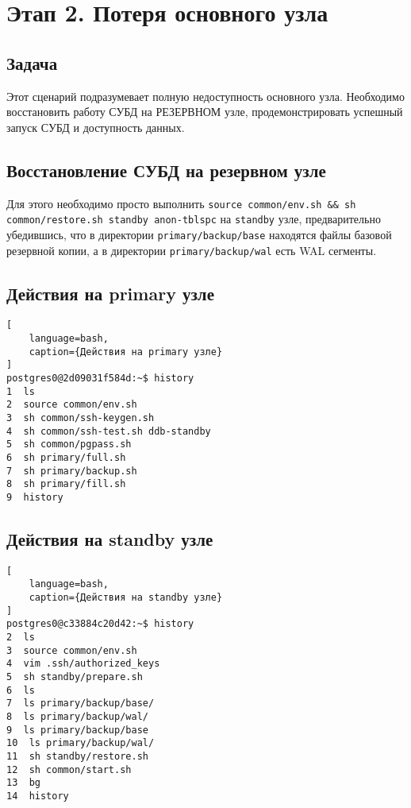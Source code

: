 \documentclass{article}
\begin{document}
\section{Этап 2. Потеря основного узла}

\subsection{Задача}

Этот сценарий подразумевает полную недоступность основного узла. Необходимо восстановить работу СУБД на РЕЗЕРВНОМ узле, продемонстрировать успешный запуск СУБД и доступность данных.

\subsection{Восстановление СУБД на резервном узле}

Для этого необходимо просто выполнить
\texttt{source common/env.sh \&\& sh common/restore.sh standby anon-tblspc}
на \texttt{standby} узле, предварительно убедившись, что в
директории \texttt{primary/backup/base} находятся файлы базовой резервной копии,
а в директории \texttt{primary/backup/wal} есть WAL сегменты.



\subsection{Действия на primary узле}

\begin{lstlisting}[
    language=bash,
    caption={Действия на primary узле}
]
postgres0@2d09031f584d:~$ history
1  ls
2  source common/env.sh 
3  sh common/ssh-keygen.sh 
4  sh common/ssh-test.sh ddb-standby
5  sh common/pgpass.sh 
6  sh primary/full.sh 
7  sh primary/backup.sh 
8  sh primary/fill.sh 
9  history
\end{lstlisting}

\subsection{Действия на standby узле}

\begin{lstlisting}[
    language=bash,
    caption={Действия на standby узле}
]
postgres0@c33884c20d42:~$ history
2  ls
3  source common/env.sh
4  vim .ssh/authorized_keys 
5  sh standby/prepare.sh 
6  ls
7  ls primary/backup/base/
8  ls primary/backup/wal/
9  ls primary/backup/base
10  ls primary/backup/wal/
11  sh standby/restore.sh 
12  sh common/start.sh 
13  bg
14  history
\end{lstlisting}
\end{document}

